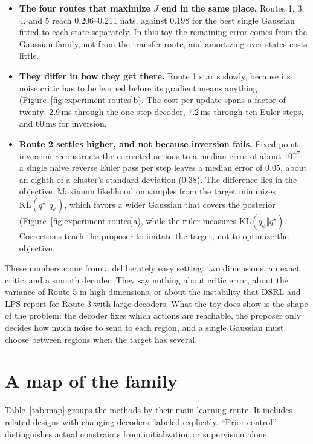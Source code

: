 \begin{itemize}
\item \textbf{The four routes that maximize $J$ end in the same place.} Routes 1, 3, 4, and 5 reach 0.206--0.211 nats, against 0.198 for the best single Gaussian fitted to each state separately. In this toy the remaining error comes from the Gaussian family, not from the transfer route, and amortizing over states costs little.
\item \textbf{They differ in how they get there.} Route 1 starts slowly, because its noise critic has to be learned before its gradient means anything (Figure~\ref{fig:experiment-routes}b). The cost per update spans a factor of twenty: 2.9\,ms through the one-step decoder, 7.2\,ms through ten Euler steps, and 60\,ms for inversion.
\item \textbf{Route 2 settles higher, and not because inversion fails.} Fixed-point inversion reconstructs the corrected actions to a median error of about $10^{-7}$; a single naive reverse Euler pass per step leaves a median error of 0.05, about an eighth of a cluster's standard deviation (0.38). The difference lies in the objective. Maximum likelihood on samples from the target minimizes $\mathrm{KL}(q^\star \Vert q_\phi)$, which favors a wider Gaussian that covers the posterior (Figure~\ref{fig:experiment-routes}a), while the ruler measures $\mathrm{KL}(q_\phi \Vert q^\star)$. Corrections teach the proposer to imitate the target, not to optimize the objective.
\end{itemize}

These numbers come from a deliberately easy setting: two dimensions, an exact critic, and a smooth decoder. They say nothing about critic error, about the variance of Route 5 in high dimensions, or about the instability that DSRL and LPS report for Route 3 with large decoders. What the toy does show is the shape of the problem: the decoder fixes which actions are reachable, the proposer only decides how much noise to send to each region, and a single Gaussian must choose between regions when the target has several.

\section{A map of the family}
\label{sec:5}
Table~\ref{tab:map} groups the methods by their main learning route. It includes related designs with changing decoders, labeled explicitly. ``Prior control'' distinguishes actual constraints from initialization or supervision alone.


